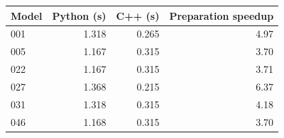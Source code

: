 \begin{tabular}{lrrr}
\toprule
Model & Python (s) & C++ (s) & Preparation speedup\\
\midrule
001 & 1.318 & 0.265 & 4.97\\
005 & 1.167 & 0.315 & 3.70\\
022 & 1.167 & 0.315 & 3.71\\
027 & 1.368 & 0.215 & 6.37\\
031 & 1.318 & 0.315 & 4.18\\
046 & 1.168 & 0.315 & 3.70\\
\bottomrule
\end{tabular}
